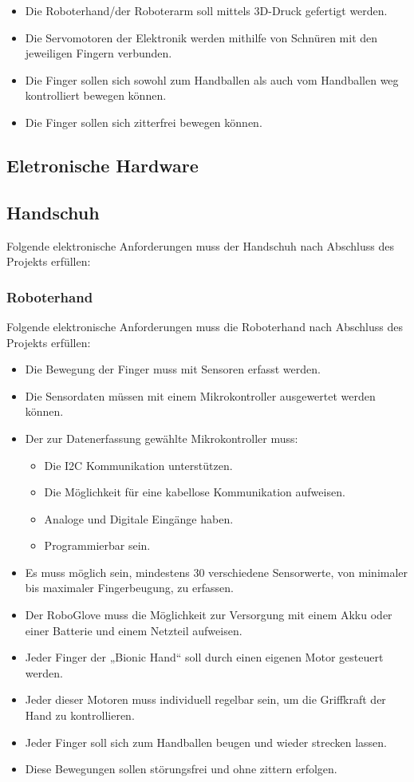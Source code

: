 \documentclass[11pt]{article}
\begin{document}
	\begin{itemize}
		\item Die Roboterhand/der Roboterarm soll mittels 3D-Druck gefertigt werden.
		\item Die Servomotoren der Elektronik werden mithilfe von Schnüren mit den jeweiligen Fingern verbunden.
		\item Die Finger sollen sich sowohl zum Handballen als auch vom Handballen weg kontrolliert bewegen können.
		\item Die Finger sollen sich zitterfrei bewegen können.
	\end{itemize}

\subsection{Eletronische Hardware}
\subsection{Handschuh}
Folgende elektronische Anforderungen muss der Handschuh nach Abschluss des Projekts erfüllen:

\subsubsection{Roboterhand}
Folgende elektronische Anforderungen muss die Roboterhand nach Abschluss des Projekts erfüllen:

	\begin{itemize}
		\item Die Bewegung der Finger muss mit Sensoren erfasst werden.
		\item Die Sensordaten müssen mit einem Mikrokontroller ausgewertet werden können.
		\item Der zur Datenerfassung gewählte Mikrokontroller muss:
		\begin{itemize}
			\item Die I2C Kommunikation unterstützen.
			\item Die Möglichkeit für eine kabellose Kommunikation aufweisen.
			\item Analoge und Digitale Eingänge haben.
			\item Programmierbar sein.
		\end{itemize}
		\item Es muss möglich sein, mindestens 30 verschiedene Sensorwerte, von minimaler bis maximaler Fingerbeugung, 
		      zu erfassen.
		\item Der RoboGlove muss die Möglichkeit zur Versorgung mit einem Akku oder einer Batterie und einem Netzteil 
		      aufweisen. 
		\item Jeder Finger der „Bionic Hand“ soll durch einen eigenen Motor gesteuert werden.
		\item Jeder dieser Motoren muss individuell regelbar sein, um die Griffkraft der Hand zu kontrollieren.	
		\item Jeder Finger soll sich zum Handballen beugen und wieder strecken lassen.	
		\item Diese Bewegungen sollen störungsfrei und ohne zittern erfolgen.
	\end{itemize}
\end{document}
